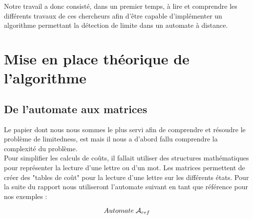 \documentclass{report}
\begin{document}
Notre travail a donc consisté, dans un premier temps, à lire et comprendre les différents travaux de ces chercheurs afin d'être capable d'implémenter un algorithme permettant la détection de limite dans un automate à distance.

\part{Mise en place théorique de l'algorithme}

\chapter{De l'automate aux matrices}

Le papier dont nous nous sommes le plus servi afin de comprendre et résoudre le problème de limitedness, est \cite{Simon:Semigroups-Matrices-over-Tropical:1994:a} mais il nous a d'abord fallu comprendre la complexité du problème.\\
Pour simplifier les calculs de coûts, il fallait utiliser des structures mathématiques pour représenter la lecture d'une lettre ou d'un mot. Les matrices permettent de créer des "tables de coût" pour la lecture d'une lettre sur les différents états. Pour la suite du rapport nous utiliseront l'automate suivant en tant que référence pour nos exemples :\\

\begin{center}
\[ Automate\; \mathcal{A}_{ref}\]
\end{center}
$\ $
\end{document}
